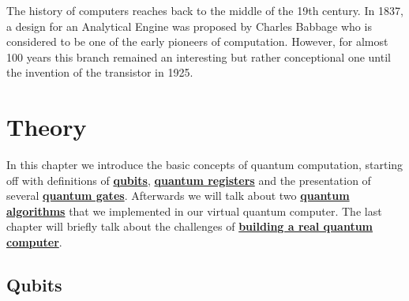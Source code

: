 \documentclass[bibliography=totocnumbered]{article}
\theoremstyle{NoticeStyle}
\begin{document}
The history of computers reaches back to the middle of the 19th century. In 1837, a design for an Analytical Engine
was proposed by Charles Babbage who is considered to be one of the early pioneers of computation. However, for almost 100 years this branch remained an interesting but rather conceptional one until the invention of the transistor in 1925. 


%
\section{Theory}

In this chapter we introduce the basic concepts of quantum computation, starting off with definitions of \hyperref[sec:Qubits]{\textbf{qubits}}, \hyperref[sec:Quantum register]{\textbf{quantum registers}} and the presentation of several \hyperref[sec:Quantum gates]{\textbf{quantum gates}}. Afterwards we will talk about two \hyperref[sec:Quantum algorithms]{\textbf{quantum algorithms}} that we implemented in our virtual quantum computer. The last chapter will briefly talk about the challenges of \hyperref[sec:Building a quantum computer]{\textbf{building a real quantum computer}}.

\subsection{Qubits}\label{sec:Qubits}
\end{document}
